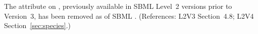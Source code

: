 The  attribute on \Species, previously available in
SBML Level~2 versions prior to Version~3, has been removed as of SBML
\thisLV.  (References: L2V3 Section~4.8; L2V4 Section~\ref{sec:species}.)
